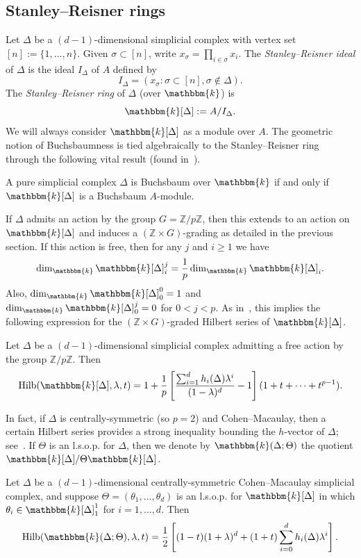 \documentclass[ALCO,ThmDefs,Unicode]{cedram}
\DeclareMathOperator{\Hilb}{Hilb}
\newcommand{\field}{\mathbbm{k}}
\newcommand{\ZZ}{{\mathbb Z}}
\begin{document}
\subsection{Stanley--Reisner rings}

Let $\Delta$ be a $(d-1)$-dimensional simplicial complex with vertex set $[n]:=\{1, \ldots, n\}$. Given $\sigma\subset [n]$, write $x_\sigma=\prod_{i\in \sigma}x_i$. The \emph{Stanley--Reisner ideal} of $\Delta$ is the ideal $I_\Delta$ of $A$ defined by
\[
I_\Delta=(x_\sigma:\sigma\subset [n], \sigma\not\in\Delta).
\]
The \emph{Stanley--Reisner ring} of $\Delta$ (over $\field$) is
\[
\field[\Delta]:= A/I_\Delta.
\]
We will always consider $\field[\Delta]$ as a module over $A$. The geometric notion of Buchsbaumness is tied algebraically to the Stanley--Reisner ring through the following vital result (found in~\cite{Schenzel}).

\begin{theo}[Schenzel]A pure simplicial complex $\Delta$ is Buchsbaum over $\field$ if and only if $\field[\Delta]$ is a Buchsbaum $A$-module.
\end{theo}

If $\Delta$ admits an action by the group $G=\ZZ/p\ZZ$, then this extends to an action on $\field[\Delta]$ and induces a $(\ZZ\times G)$-grading as detailed in the previous section. If this action is free, then for any $j$ and $i\ge 1$ we have
\[
\dim_\field \field[\Delta]_i^j=\frac{1}{p}\dim_\field \field[\Delta]_i.
\]
Also, $\dim_\field \field[\Delta]_0^0=1$ and $\dim_\field \field[\Delta]_0^j=0$ for $0<j<p$. As in~\cite[Section~3]{St-87}, this implies the following expression for the $(\ZZ\times G)$-graded Hilbert series of $\field[\Delta]$.

\begin{theo}\label{SRHilb}
Let $\Delta$ be a $(d-1)$-dimensional simplicial complex admitting a free action by the group $\ZZ/p\ZZ$. Then
\[
\Hilb(\field[\Delta], \lambda, t)=1+\frac{1}{p}\left[\frac{\sum_{i=1}^d h_i(\Delta)\lambda^i}{(1-\lambda)^d}-1\right](1+t+\cdots+t^{p-1}).
\]
\end{theo}

In fact, if $\Delta$ is centrally-symmetric (so $p=2$) and Cohen--Macaulay, then a certain Hilbert series provides a strong inequality bounding the $h$-vector of $\Delta$; see~\cite[Theorem~III.8.1]{St-96}. If $\Theta$ is an l.s.o.p. for $\Delta$, then we denote by $\field(\Delta; \Theta)$ the quotient $\field[\Delta]/\Theta\field[\Delta]$.

\begin{theo}[Stanley]
Let $\Delta$ be a $(d-1)$-dimensional centrally-symmetric Cohen--Macaulay simplicial complex, and suppose $\Theta=(\theta_1, \ldots, \theta_d)$ is an l.s.o.p. for $\field[\Delta]$ in which $\theta_i\in\field[\Delta]_1^1$ for $i=1, \ldots, d$. Then
\[
\Hilb(\field(\Delta; \Theta), \lambda, t)=\frac{1}{2}\left[(1-t)(1+\lambda)^d+(1+t)\sum_{i=0}^dh_i(\Delta)\lambda^i\right].
\]
\end{theo}
\end{document}
